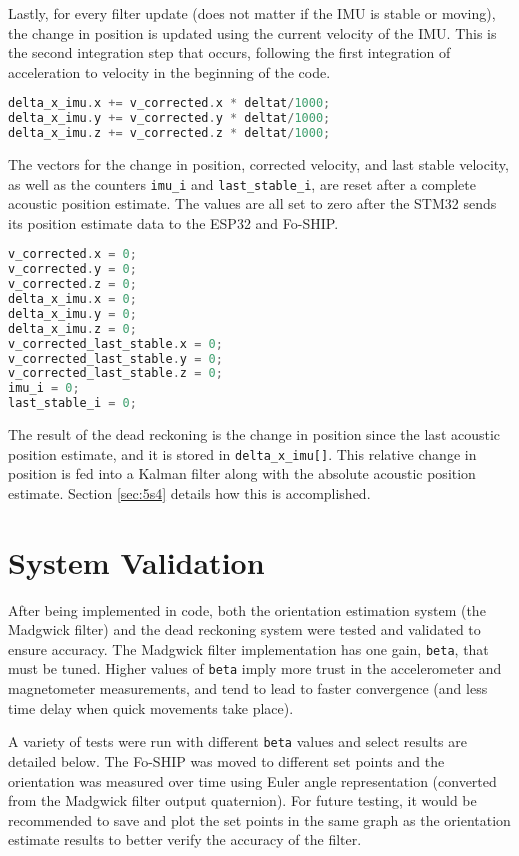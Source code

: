 \documentclass[12pt,a4paper]{report}
\begin{document}
Lastly, for every filter update (does not matter if the IMU is stable or moving), the change in position is updated using the current velocity of the IMU. This is the second integration step that occurs, following the first integration of acceleration to velocity in the beginning of the code.

\begin{lstlisting}[language=C++]
delta_x_imu.x += v_corrected.x * deltat/1000;
delta_x_imu.y += v_corrected.y * deltat/1000;
delta_x_imu.z += v_corrected.z * deltat/1000;
\end{lstlisting}

The vectors for the change in position, corrected velocity, and last stable velocity, as well as the counters \verb|imu_i| and \verb|last_stable_i|, are reset after a complete acoustic position estimate. The values are all set to zero after the STM32 sends its position estimate data to the ESP32 and Fo-SHIP.

\begin{lstlisting}[language=C++]
v_corrected.x = 0;
v_corrected.y = 0;
v_corrected.z = 0;
delta_x_imu.x = 0;
delta_x_imu.y = 0;
delta_x_imu.z = 0;
v_corrected_last_stable.x = 0;
v_corrected_last_stable.y = 0;
v_corrected_last_stable.z = 0;
imu_i = 0;
last_stable_i = 0;
\end{lstlisting}

The result of the dead reckoning is the change in position since the last acoustic position estimate, and it is stored in \verb|delta_x_imu[]|. This relative change in position is fed into a Kalman filter along with the absolute acoustic position estimate. Section \ref{sec:5s4} details how this is accomplished.

\section{System Validation} \label{sec:4s6}
After being implemented in code, both the orientation estimation system (the Madgwick filter) and the dead reckoning system were tested and validated to ensure accuracy. The Madgwick filter implementation has one gain, \verb|beta|, that must be tuned. Higher values of \verb|beta| imply more trust in the accelerometer and magnetometer measurements, and tend to lead to faster convergence (and less time delay when quick movements take place).

A variety of tests were run with different \verb|beta| values and select results are detailed below. The Fo-SHIP was moved to different set points and the orientation was measured over time using Euler angle representation (converted from the Madgwick filter output quaternion). For future testing, it would be recommended to save and plot the set points in the same graph as the orientation estimate results to better verify the accuracy of the filter.
\end{document}
